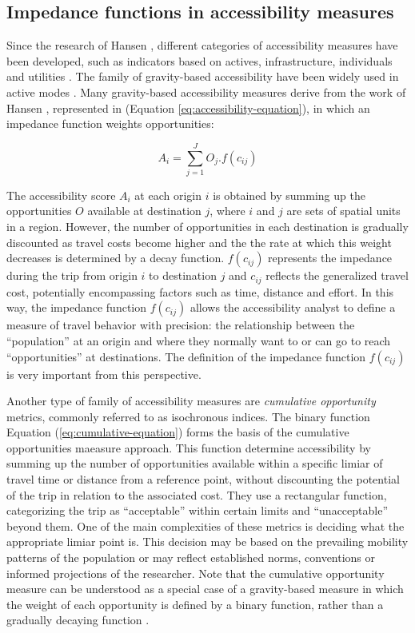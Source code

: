 \documentclass[preprint, 3p,
authoryear]{elsarticle} %
\begin{document}
\subsection{Impedance functions in accessibility
measures}\label{impedance-functions-in-accessibility-measures}

Since the research of Hansen \citeyearpar{hansen1959accessibility},
different categories of accessibility measures have been developed, such
as indicators based on actives, infrastructure, individuals and
utilities \citep{geurs2004, paez2012}. The family of gravity-based
accessibility have been widely used in active modes
\citep{miller2005place}. Many gravity-based accessibility measures
derive from the work of Hansen \citeyearpar{hansen1959accessibility},
represented in (Equation \ref{eq:accessibility-equation}), in which an
impedance function weights opportunities:

\begin{equation}
A_{i} = \sum_{j=1}^J O_j .f(c_{ij})
\label{eq:accessibility-equation}
\end{equation}

The accessibility score \(A_{i}\) at each origin \(i\) is obtained by
summing up the opportunities \(O\) available at destination \(j\), where
\(i\) and \(j\) are sets of spatial units in a region. However, the
number of opportunities in each destination is gradually discounted as
travel costs become higher and the the rate at which this weight
decreases is determined by a decay function. \(f(c_{ij})\) represents
the impedance during the trip from origin \(i\) to destination \(j\) and
\(c_{ij}\) reflects the generalized travel cost, potentially
encompassing factors such as time, distance and effort. In this way, the
impedance function \(f(c_{ij})\) allows the accessibility analyst to
define a measure of travel behavior with precision: the relationship
between the ``population'' at an origin and where they normally want to
or can go to reach ``opportunities'' at destinations. The definition of
the impedance function \(f(c_{ij})\) is very important from this
perspective.

Another type of family of accessibility measures are \emph{cumulative
opportunity} metrics, commonly referred to as isochronous indices. The
binary function Equation (\ref{eq:cumulative-equation}) forms the basis
of the cumulative opportunities maeasure approach. This function
determine accessibility by summing up the number of opportunities
available within a specific limiar of travel time or distance from a
reference point, without discounting the potential of the trip in
relation to the associated cost. They use a rectangular function,
categorizing the trip as ``acceptable'' within certain limits and
``unacceptable'' beyond them. One of the main complexities of these
metrics is deciding what the appropriate limiar point is. This decision
may be based on the prevailing mobility patterns of the population or
may reflect established norms, conventions or informed projections of
the researcher. Note that the cumulative opportunity measure can be
understood as a special case of a gravity-based measure in which the
weight of each opportunity is defined by a binary function, rather than
a gradually decaying function \citep{pereira2023}.
\end{document}
